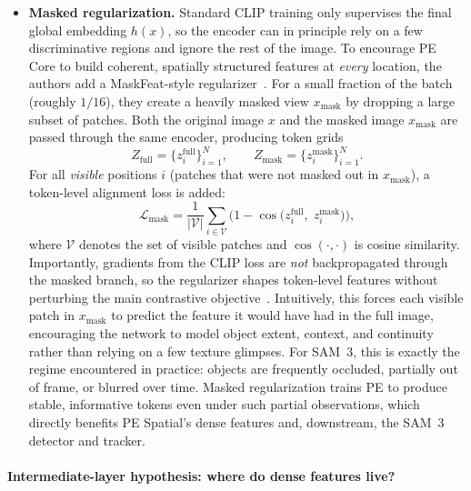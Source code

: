 \begin{enrichment}
\begin{enrichment}
\begin{itemize}
	       This late, dedicated pooling step is one of the reasons the Perception Encoder
	       succeeds as a unified backbone for both global vision–language alignment and
	       dense prediction, a requirement at the heart of SAM~3.
			
			\item \textbf{Masked regularization.} Standard CLIP training only supervises the final global embedding $h(x)$, so the encoder can in principle rely on a few discriminative regions and ignore the rest of the image. To encourage PE Core to build coherent, spatially structured features at \emph{every} location, the authors add a MaskFeat-style regularizer~\cite{wei2022_maskfeat,bolya2025_perceptionencoder}. For a small fraction of the batch (roughly $1/16$), they create a heavily masked view $x_{\text{mask}}$ by dropping a large subset of patches. Both the original image $x$ and the masked image $x_{\text{mask}}$ are passed through the same encoder, producing token grids
			\[
			Z_{\text{full}} = \{z^{\text{full}}_i\}_{i=1}^N, \qquad
			Z_{\text{mask}} = \{z^{\text{mask}}_i\}_{i=1}^N.
			\]
			For all \emph{visible} positions $i$ (patches that were not masked out in $x_{\text{mask}}$), a token-level alignment loss is added:
			\[
			\mathcal{L}_{\text{mask}} = \frac{1}{|\mathcal{V}|} \sum_{i \in \mathcal{V}} \bigl(1 - \cos\bigl(z^{\text{full}}_i,\; z^{\text{mask}}_i\bigr)\bigr),
			\]
			where $\mathcal{V}$ denotes the set of visible patches and $\cos(\cdot,\cdot)$ is cosine similarity. Importantly, gradients from the CLIP loss are \emph{not} backpropagated through the masked branch, so the regularizer shapes token-level features without perturbing the main contrastive objective~\cite{bolya2025_perceptionencoder}. Intuitively, this forces each visible patch in $x_{\text{mask}}$ to predict the feature it would have had in the full image, encouraging the network to model object extent, context, and continuity rather than relying on a few texture glimpses. For SAM~3, this is exactly the regime encountered in practice: objects are frequently occluded, partially out of frame, or blurred over time. Masked regularization trains PE to produce stable, informative tokens even under such partial observations, which directly benefits PE Spatial’s dense features and, downstream, the SAM~3 detector and tracker.
			
		\end{itemize}
		
		\newpage
		
		\paragraph{Intermediate-layer hypothesis: where do dense features live?}
		

\end{enrichment}
\end{enrichment}
